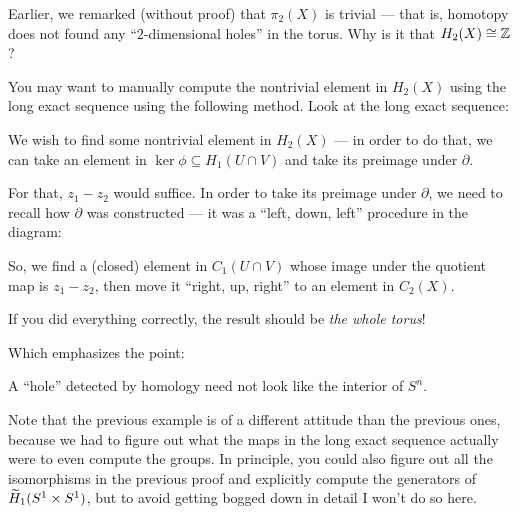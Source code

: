 \begin{remark}
	Earlier, we remarked (without proof) that $\pi_2(X)$ is trivial --- that is, homotopy does not
	found any ``$2$-dimensional holes'' in the torus. Why is it that $H_2(X) \cong \mathbb Z$?

	You may want to manually compute the nontrivial element in $H_2(X)$ using the long
	exact sequence using the following method. Look at the long exact sequence:
	\begin{center}
	\end{center}
	We wish to find some nontrivial element in $H_2(X)$ --- in order to do that, we can take an
	element in $\ker \phi \subseteq H_1(U \cap V)$ and take its preimage under $\partial$.

	For that, $z_1 - z_2$ would suffice. In order to take its preimage under $\partial$, we need to
	recall how $\partial$ was constructed --- it was a ``left, down, left'' procedure in the
	diagram:
	\begin{center}
	\end{center}
	So, we find a (closed) element in $C_1(U \cap V)$ whose image under the quotient map is
	$z_1 - z_2$, then move it ``right, up, right'' to an element in $C_2(X)$.

	If you did everything correctly, the result should be \emph{the whole torus}!
\end{remark}
Which emphasizes the point:
\begin{moral}
	A ``hole'' detected by homology need not look like the interior of $S^n$.
\end{moral}

Note that the previous example is of a different attitude than the previous ones,
because we had to figure out what the maps in the long exact sequence actually were
to even compute the groups.
In principle, you could also figure out all the isomorphisms in the previous proof
and explicitly compute the generators of $\widetilde H_1(S^1 \times S^1)$,
but to avoid getting bogged down in detail I won't do so here.

